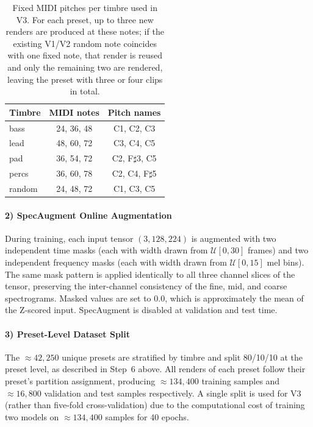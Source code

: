 \begin{table}[H]
\centering
\renewcommand{\arraystretch}{1.3}
\begin{tabular}{lcc}
\hline
\textbf{Timbre} & \textbf{MIDI notes} & \textbf{Pitch names} \\
\hline
bass   & 24, 36, 48 & C1, C2, C3 \\
lead   & 48, 60, 72 & C3, C4, C5 \\
pad    & 36, 54, 72 & C2, F$\sharp$3, C5 \\
percs  & 36, 60, 78 & C2, C4, F$\sharp$5 \\
random & 24, 48, 72 & C1, C3, C5 \\
\hline
\end{tabular}
\vspace{0.3cm}
\caption{Fixed MIDI pitches per timbre used in V3. For each preset, up to three new renders are produced at these notes; if the existing V1/V2 random note coincides with one fixed note, that render is reused and only the remaining two are rendered, leaving the preset with three or four clips in total.}
\label{tab:v3_midi}
\end{table}

\paragraph{2) SpecAugment Online Augmentation}
During training, each input tensor $(3, 128, 224)$ is augmented with two independent time masks (each with width drawn from $\mathcal{U}[0, 30]$ frames) and two independent frequency masks (each with width drawn from $\mathcal{U}[0, 15]$ mel bins). The same mask pattern is applied identically to all three channel slices of the tensor, preserving the inter-channel consistency of the fine, mid, and coarse spectrograms. Masked values are set to $0.0$, which is approximately the mean of the Z-scored input. SpecAugment is disabled at validation and test time.

\paragraph{3) Preset-Level Dataset Split}
The $\approx 42{,}250$ unique presets are stratified by timbre and split 80/10/10 at the preset level, as described in Step~6 above. All renders of each preset follow their preset's partition assignment, producing $\approx 134{,}400$ training samples and $\approx 16{,}800$ validation and test samples respectively. A single split is used for V3 (rather than five-fold cross-validation) due to the computational cost of training two models on $\approx 134{,}400$ samples for 40 epochs.

